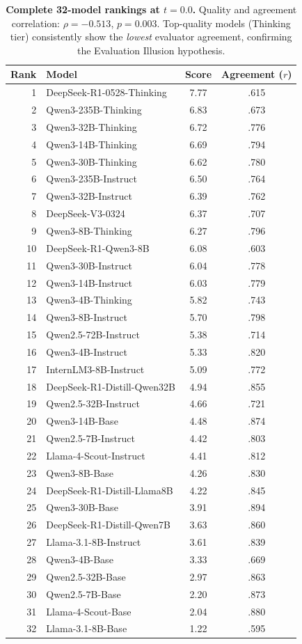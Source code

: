 \documentclass{article}
\begin{document}
\begin{table}[h]
\centering
\caption{\textbf{Complete 32-model rankings at $t{=}0.0$.} Quality and agreement correlation: $\rho = -0.513$, $p = 0.003$. Top-quality models (Thinking tier) consistently show the \textit{lowest} evaluator agreement, confirming the Evaluation Illusion hypothesis.}
\label{tab:full_ranking}
\small
\begin{tabular}{rlcc}
\toprule
\textbf{Rank} & \textbf{Model} & \textbf{Score} & \textbf{Agreement ($r$)} \\
\midrule
1 & DeepSeek-R1-0528-Thinking & 7.77 & .615 \\
2 & Qwen3-235B-Thinking & 6.83 & .673 \\
3 & Qwen3-32B-Thinking & 6.72 & .776 \\
4 & Qwen3-14B-Thinking & 6.69 & .794 \\
5 & Qwen3-30B-Thinking & 6.62 & .780 \\
6 & Qwen3-235B-Instruct & 6.50 & .764 \\
7 & Qwen3-32B-Instruct & 6.39 & .762 \\
8 & DeepSeek-V3-0324 & 6.37 & .707 \\
9 & Qwen3-8B-Thinking & 6.27 & .796 \\
10 & DeepSeek-R1-Qwen3-8B & 6.08 & .603 \\
11 & Qwen3-30B-Instruct & 6.04 & .778 \\
12 & Qwen3-14B-Instruct & 6.03 & .779 \\
13 & Qwen3-4B-Thinking & 5.82 & .743 \\
14 & Qwen3-8B-Instruct & 5.70 & .798 \\
15 & Qwen2.5-72B-Instruct & 5.38 & .714 \\
16 & Qwen3-4B-Instruct & 5.33 & .820 \\
17 & InternLM3-8B-Instruct & 5.09 & .772 \\
18 & DeepSeek-R1-Distill-Qwen32B & 4.94 & .855 \\
19 & Qwen2.5-32B-Instruct & 4.66 & .721 \\
20 & Qwen3-14B-Base & 4.48 & .874 \\
21 & Qwen2.5-7B-Instruct & 4.42 & .803 \\
22 & Llama-4-Scout-Instruct & 4.41 & .812 \\
23 & Qwen3-8B-Base & 4.26 & .830 \\
24 & DeepSeek-R1-Distill-Llama8B & 4.22 & .845 \\
25 & Qwen3-30B-Base & 3.91 & .894 \\
26 & DeepSeek-R1-Distill-Qwen7B & 3.63 & .860 \\
27 & Llama-3.1-8B-Instruct & 3.61 & .839 \\
28 & Qwen3-4B-Base & 3.33 & .669 \\
29 & Qwen2.5-32B-Base & 2.97 & .863 \\
30 & Qwen2.5-7B-Base & 2.20 & .873 \\
31 & Llama-4-Scout-Base & 2.04 & .880 \\
32 & Llama-3.1-8B-Base & 1.22 & .595 \\
\bottomrule
\end{tabular}
\end{table}
\end{document}

